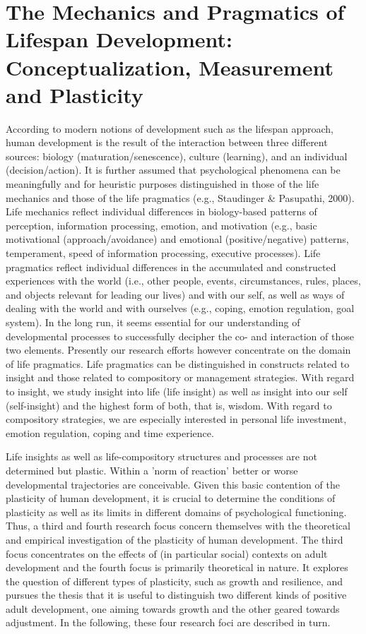 \section{The Mechanics and Pragmatics of Lifespan Development: Conceptualization, Measurement and Plasticity}

According to modern notions of development such as the lifespan approach, human development is the result of the interaction between three different sources: biology (maturation/senescence), culture (learning), and an individual (decision/action). It is further assumed that psychological phenomena can be meaningfully and for heuristic purposes distinguished in those of the life mechanics and those of the life pragmatics (e.g., Staudinger \& Pasupathi, 2000). Life mechanics reflect individual differences in biology-based patterns of perception, information processing, emotion, and motivation (e.g., basic motivational (approach/avoidance) and emotional (positive/negative) patterns, temperament, speed of information processing, executive processes). Life pragmatics reflect individual differences in the accumulated and constructed experiences with the world (i.e., other people, events, circumstances, rules, places, and objects relevant for leading our lives) and with our self, as well as ways of dealing with the world and with ourselves (e.g., coping, emotion regulation, goal system). In the long run, it seems essential for our understanding of developmental processes to successfully decipher the co- and interaction of those two elements. Presently our research efforts however concentrate on the domain of life pragmatics. Life pragmatics can be distinguished in constructs related to insight and those related to compository or management strategies. With regard to insight, we study insight into life (life insight) as well as insight into our self (self-insight) and the highest form of both, that is, wisdom. With regard to compository strategies, we are especially interested in personal life investment, emotion regulation, coping and time experience. 

Life insights as well as life-compository structures and processes are not determined but plastic. Within a 'norm of reaction' better or worse developmental trajectories are conceivable. Given this basic contention of the plasticity of human development, it is crucial to determine the conditions of plasticity as well as its limits in different domains of psychological functioning. Thus, a third and fourth research focus concern themselves with the theoretical and empirical investigation of the plasticity of human development. The third focus concentrates on the effects of (in particular social) contexts on adult development and the fourth focus is primarily theoretical in nature. It explores the question of different types of plasticity, such as growth and resilience, and pursues the thesis that it is useful to distinguish two different kinds of positive adult development, one aiming towards growth and the other geared towards adjustment. In the following, these four research foci are described in turn.

